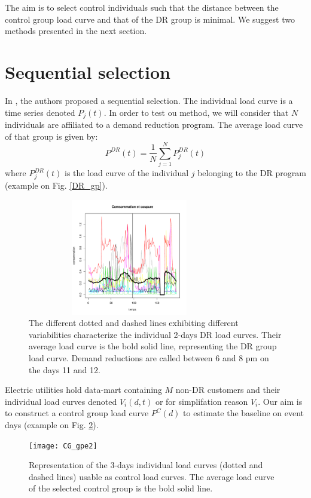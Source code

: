 \documentclass[journal]{IEEEtran}
\begin{document}
The aim is to select control individuals such that the distance between 
the control group load curve and that of the DR group is minimal. We suggest two methods 
presented in the next section.  

\section{Sequential selection}\label{sec:new}
In \cite{directestimation}, the authors proposed a sequential selection.
The individual load curve is a
time series denoted $P_j(t)$. In order to test ou method, we will consider that $N$
individuals are affiliated to a demand reduction program. The average load curve of
that group is given by: 
\begin{equation}\label{eq:DRcurve}
P^{DR}(t)=\frac{1}{N}\sum_{j=1}^N P_j^{DR}(t)
\end{equation}
where $P_j^{DR}(t)$ is the load curve of the individual $j$ belonging to the DR program 
(example on Fig. \ref{DR_gp}).
\begin{figure}[!h]
\centering
\includegraphics[width=3.5in,height=2in]{DR_gp}
\caption{{\scriptsize The different dotted and dashed lines exhibiting different
variabilities characterize the individual 2-days DR load curves. Their average load
curve is the bold solid line, representing the DR group load curve. Demand reductions
are called between 6 and 8 pm on the days 11 and 12.}}
\label{DR_gpe2}
\end{figure}
Electric utilities hold data-mart containing $M$ non-DR customers and their individual 
load curves denoted $V_i(d,t)$ or for simplifation reason $V_i$. Our aim is to construct
a control group load curve $P^{C}(d)$ to estimate the baseline on event days (example
on Fig. \ref{CG_gpe2}). 
\begin{figure}[!h]
\centering
\texttt{[image: CG\_gpe2]}
\caption{{\scriptsize Representation of the 3-days individual load curves (dotted
and dashed lines) usable as control load curves. The average load curve of the selected
control group is the bold solid line.}}
\label{CG_gpe2}
\end{figure}
\end{document}
